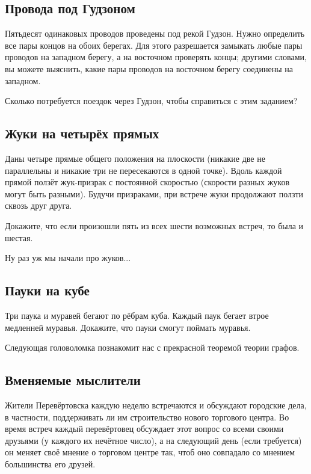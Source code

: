 \subsection*{Провода под Гудзоном}

Пятьдесят одинаковых проводов проведены под рекой Гудзон.
Нужно определить все пары концов на обоих берегах.
Для этого разрешается замыкать любые пары проводов на западном берегу, а на восточном проверять концы;
другими словами, вы можете выяснить, какие пары проводов на восточном берегу соединены на западном.

Сколько потребуется поездок через Гудзон, чтобы справиться с этим заданием?

\subsection*{Жуки на четырёх прямых}

Даны четыре прямые общего положения на плоскости (никакие две не параллельны и никакие три не пересекаются в одной точке).
Вдоль каждой прямой ползёт жук-призрак с постоянной скоростью (скорости разных жуков могут быть разными).
Будучи призраками, при встрече жуки продолжают ползти сквозь друг друга.

Докажите, что если произошли пять из всех шести возможных встреч,
то была и шестая.

\medskip

Ну раз уж мы начали про жуков...

\subsection*{Пауки на кубе}

Три паука и муравей бегают по рёбрам куба.
Каждый паук бегает втрое медленней муравья.
Докажите, что пауки смогут поймать муравья.

\medskip

Следующая головоломка познакомит нас с прекрасной теоремой теории графов.

\subsection*{Вменяемые мыслители}\label{Вменяемые мыслители}

Жители Перевёртовска каждую неделю встречаются и обсуждают городские дела, в частности, поддерживать ли им строительство нового торгового центра.
Во время встреч каждый перевёртовец обсуждает этот вопрос со всеми своими друзьями (у каждого их нечётное число), а на следующий день (если требуется) он меняет своё мнение о торговом центре так, чтоб оно совпадало со мнением большинства его друзей.

